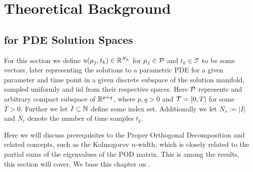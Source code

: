\section{Theoretical Background}


\subsection{for PDE Solution Spaces} \label{section: background for PDE solutions}


For this section we define $u(\mu_j, t_k) \in \mathbb{R}^{N_h}$ for $\mu_j \in \mathcal{P}$ and $t_k \in \mathcal{T}$ to be some vectors, later representing the solutions to a parametric PDE for a given parameter and time point in a given discrete subspace of the solution manifold, sampled uniformly and iid from their respective spaces. Here $\mathcal{P}$ represents and arbitrary compact subspace of $\mathbb{R}^{p + q}$, where $p, q > 0$ and $\mathcal{T} = [0, T]$ for some $T > 0$. Further we let $I \subset \mathbb{N}$ define some index set. Additionally we let $N_s := \vert I \vert$ and $N_t$ denote the number of time samples $t_k$.

Here we will discuss prerequisites to the Proper Orthogonal Decomposition and related concepts, such as the Kolmogorov $n$-width, which is closely related to the partial sums of the eigenvalues of the POD matrix. This is among the results, this section will cover. We base this chapter on \cite{quarteroni2015rb}.


